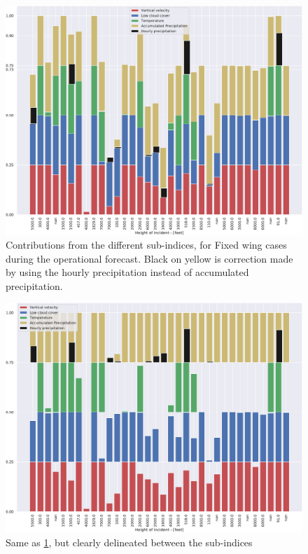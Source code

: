 \begin{figure}[H]
    \centering
    \includegraphics[width=\textwidth]{Figures/FWAccum.pdf}
    \caption{Contributions from the different sub-indices, for Fixed wing cases during the operational forecast. Black on yellow is correction made by using the hourly precipitation instead of accumulated precipitation.}
    \label{fig:FWAccum}
\end{figure}

\begin{figure}[H]
    \centering
    \includegraphics[width=\textwidth]{Figures/FWDecomp.pdf}
    \caption{Same as \ref{fig:FWAccum}, but clearly delineated between the sub-indices}
    \label{fig:FWDecomp}
\end{figure}





